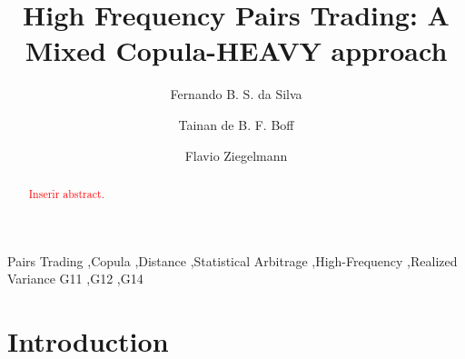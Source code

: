 \documentclass[review]{elsarticle}
\begin{document}
\begin{frontmatter}

\title{High Frequency Pairs Trading: A Mixed Copula-HEAVY approach}



\author[address1]{Fernando B. S. da Silva}

\author[address2]{Tainan de B. F. Boff}

\author[address1]{Flavio Ziegelmann}

\address[address1]{Department of Statistics, Institute of Mathematics and Statistics, Federal University of Rio Grande do Sul, 9500 Bento Gonçalves Av., 43-111, Porto Alegre, RS, 91509-900, Brazil}
\address[address2]{Graduate Program in Economics, Federal University of Rio Grande do Sul, Porto Alegre, Brazil}

\begin{abstract}
\textcolor{red}{Inserir abstract.}
\end{abstract}

\begin{keyword}
Pairs Trading \sep Copula \sep Distance \sep Statistical Arbitrage \sep High-Frequency \sep Realized Variance %
\JEL  G11 \sep G12 \sep G14 
\end{keyword}

\end{frontmatter}

\linenumbers

\section{Introduction}
\end{document}
